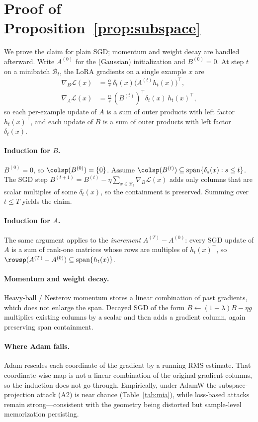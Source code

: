 \section{Proof of Proposition~\ref{prop:subspace}}\label{app:proof}

We prove the claim for plain SGD; momentum and weight decay are handled
afterward. Write $A^{(0)}$ for the (Gaussian) initialization and
$B^{(0)}=0$. At step $t$ on a minibatch $\mathcal{B}_t$, the LoRA
gradients on a single example $x$ are
\begin{align*}
\nabla_B\mathcal{L}(x)
&=\tfrac{\alpha}{r}\,\delta_t(x)\big(A^{(t)}h_t(x)\big)^{\!\top},\\
\nabla_A\mathcal{L}(x)
&=\tfrac{\alpha}{r}\,(B^{(t)})^{\!\top}\delta_t(x)\,h_t(x)^{\!\top},
\end{align*}
so each per-example update of $A$ is a sum of outer products with left
factor $h_t(x)^\top$, and each update of $B$ is a sum of outer products
with left factor $\delta_t(x)$.

\paragraph{Induction for $B$.}
$B^{(0)}=0$, so $\colsp(B^{(0)})=\{0\}$. Assume
$\colsp(B^{(t)})\subseteq\mathrm{span}\{\delta_s(x):s\le t\}$. The SGD
step $B^{(t+1)}=B^{(t)}-\eta\sum_{x\in\mathcal{B}_t}\nabla_B\mathcal{L}(x)$
adds only columns that are scalar multiples of some $\delta_t(x)$, so
the containment is preserved. Summing over $t\le T$ yields the claim.

\paragraph{Induction for $A$.}
The same argument applies to the \emph{increment}
$A^{(T)}-A^{(0)}$: every SGD update of $A$ is a sum of rank-one
matrices whose rows are multiples of $h_t(x)^\top$, so
$\rowsp(A^{(T)}-A^{(0)})\subseteq\mathrm{span}\{h_t(x)\}$.

\paragraph{Momentum and weight decay.}
Heavy-ball / Nesterov momentum stores a linear combination of past
gradients, which does not enlarge the span. Decayed SGD of the form
$B\leftarrow(1-\lambda)B-\eta g$ multiplies existing columns by a
scalar and then adds a gradient column, again preserving span
containment.

\paragraph{Where Adam fails.}
Adam rescales each coordinate of the gradient by a running RMS estimate.
That coordinate-wise map is not a linear combination of the original
gradient columns, so the induction does not go through. Empirically,
under AdamW the subspace-projection attack (A2) is near chance
(Table~\ref{tab:mia}), while loss-based attacks remain strong---consistent
with the geometry being distorted but sample-level memorization
persisting.
